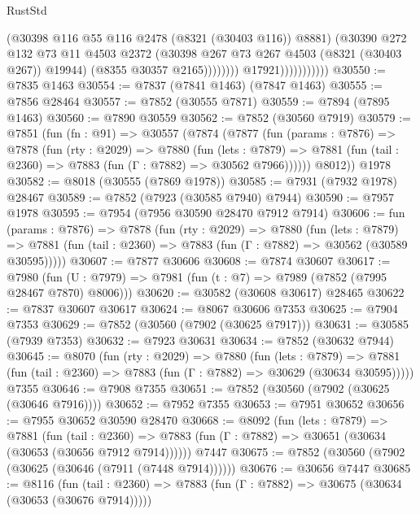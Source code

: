 \begin{lexlean}{RustStd}
\begin{coremodule}
                                      (@30398 @116 @55 @116 @2478 (@8321 (@30403 @116)) @8881)
                                      (@30390
                                        @272
                                        @132
                                        @73
                                        @11
                                        @4503
                                        @2372
                                        (@30398 @267 @73 @267 @4503 (@8321 (@30403 @267)) @19944)
                                        (@8355 @30357 @2165))))))))
                          @17921)))))))))))
@30550 := @7835 @1463
@30554 := @7837 (@7841 @1463) (@7847 @1463)
@30555 := @7856 @28464
@30557 := @7852 (@30555 @7871)
@30559 := @7894 (@7895 @1463)
@30560 := @7890 @30559
@30562 := @7852 (@30560 @7919)
@30579 := @7851
    (fun (fn : @91) =>
    @30557
      (@7874
        (@7877
          (fun (params : @7876) =>
          @7878
            (fun (rty : @2029) =>
            @7880
              (fun (lets : @7879) =>
              @7881 (fun (tail : @2360) => @7883 (fun (Γ : @7882) => @30562 @7966))))))
        @8012))
    @1978
@30582 := @8018 (@30555 (@7869 @1978))
@30585 := @7931 (@7932 @1978) @28467
@30589 := @7852 (@7923 (@30585 @7940) @7944)
@30590 := @7957 @1978
@30595 := @7954 (@7956 @30590 @28470 @7912 @7914)
@30606 := fun (params : @7876) =>
  @7878
    (fun (rty : @2029) =>
    @7880
      (fun (lets : @7879) =>
      @7881 (fun (tail : @2360) => @7883 (fun (Γ : @7882) => @30562 (@30589 @30595)))))
@30607 := @7877 @30606
@30608 := @7874 @30607
@30617 := @7980
    (fun (U : @7979) => @7981 (fun (t : @7) => @7989 (@7852 (@7995 @28467 @7870) @8006)))
@30620 := @30582 (@30608 @30617) @28465
@30622 := @7837 @30607 @30617
@30624 := @8067 @30606 @7353
@30625 := @7904 @7353
@30629 := @7852 (@30560 (@7902 (@30625 @7917)))
@30631 := @30585 (@7939 @7353)
@30632 := @7923 @30631
@30634 := @7852 (@30632 @7944)
@30645 := @8070
    (fun (rty : @2029) =>
    @7880
      (fun (lets : @7879) =>
      @7881 (fun (tail : @2360) => @7883 (fun (Γ : @7882) => @30629 (@30634 @30595)))))
    @7355
@30646 := @7908 @7355
@30651 := @7852 (@30560 (@7902 (@30625 (@30646 @7916))))
@30652 := @7952 @7355
@30653 := @7951 @30652
@30656 := @7955 @30652 @30590 @28470
@30668 := @8092
    (fun (lets : @7879) =>
    @7881
      (fun (tail : @2360) =>
      @7883 (fun (Γ : @7882) => @30651 (@30634 (@30653 (@30656 @7912 @7914))))))
    @7447
@30675 := @7852 (@30560 (@7902 (@30625 (@30646 (@7911 (@7448 @7914))))))
@30676 := @30656 @7447
@30685 := @8116
    (fun (tail : @2360) => @7883 (fun (Γ : @7882) => @30675 (@30634 (@30653 (@30676 @7914)))))

\end{coremodule}
\end{lexlean}
